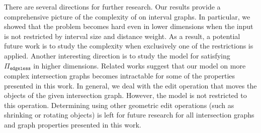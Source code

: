 There are several directions for further research.
Our results provide a comprehensive picture of the complexity of {\gged} on interval graphs. 
In particular, we showed that the problem becomes hard even in lower dimensions when the input is not restricted by interval size and distance weight.
As a result, a potential future work is to study the complexity when exclusively one of the restrictions is applied.
Another interesting direction is to study the model for satisfying $\Pi_{\texttt{edgeless}}$ in higher dimensions.
Related works \cite{fomin2023,Fomin2025,Fiala2005} suggest that our model on more complex intersection graphs becomes intractable for some of the properties presented in this work. 
In general, we deal with the edit operation that moves the objects of the given intersection graph. 
However, the model is not restricted to this operation. 
Determining {\gged} using other geometric edit operations (such as shrinking or rotating objects) is left for future research for all intersection graphs and graph properties presented in this work.